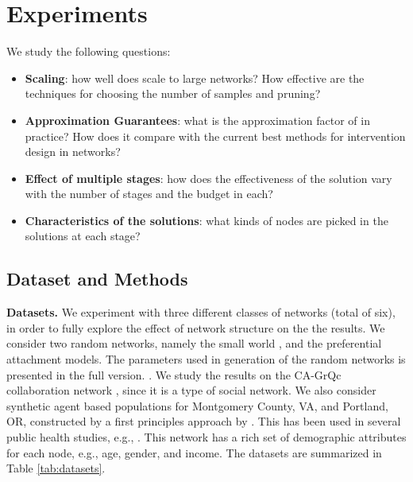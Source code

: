 \section{Experiments}
\label{sec:experiments}

We study the following questions:
\begin{itemize}
\item
\textbf{Scaling}: how well does \algo{} scale to large networks? How effective are the techniques for choosing the
number of samples and pruning?
\item
\textbf{Approximation Guarantees}: what is the approximation factor of \algo{} in practice? How does it compare with 
the current best methods for intervention design in networks?
\item
\textbf{Effect of multiple stages}: how does the effectiveness of the solution vary with the number of stages
and the budget in each?
\item
\textbf{Characteristics of the solutions}: what kinds of nodes are picked in the solutions at each stage?
\end{itemize}

\subsection{Dataset and Methods}

\noindent
\textbf{Datasets.}
We experiment with three different classes of networks (total of six),
in order to fully explore the effect of network structure on the the results. 
We consider two random networks, namely the small world 
\cite{Kleinberg00thesmall-world}, and the preferential attachment \cite{Barabasi509} models. The parameters used in generation of the random networks is presented in the full version. \cite{sambaturu:AAAI20}. We study the results on the CA-GrQc collaboration network \cite{Leskovec:2007:GED:1217299.1217301}, since it is a type of social network. We also consider synthetic agent based populations for Montgomery County, VA, and Portland, OR, constructed by a first principles approach by \cite{barrett:wsc09,eubank:nature04}. This has been used in several public health studies, e.g., \cite{singh:bmc19}. This network has a rich set of demographic attributes for each node, e.g., age, gender, and income.
The datasets are summarized in Table \ref{tab:datasets}.


